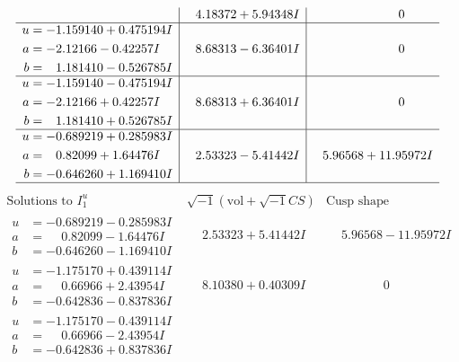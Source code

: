 \documentclass[1p]{elsarticle_modified}
\theoremstyle{definition}
\newcommand{\I}{\sqrt{-1}}
\begin{document}
$$\begin{array}{c|c|c}
 & \phantom{-}4.18372 + 5.94348 I & \phantom{-0.000000 } 0 \\ \hline\begin{aligned}
u &= -1.159140 + 0.475194 I \\
a &= -2.12166 - 0.42257 I \\
b &= \phantom{-}1.181410 - 0.526785 I\end{aligned}
 & \phantom{-}8.68313 - 6.36401 I & \phantom{-0.000000 } 0 \\ \hline\begin{aligned}
u &= -1.159140 - 0.475194 I \\
a &= -2.12166 + 0.42257 I \\
b &= \phantom{-}1.181410 + 0.526785 I\end{aligned}
 & \phantom{-}8.68313 + 6.36401 I & \phantom{-0.000000 } 0 \\ \hline\begin{aligned}
u &= -0.689219 + 0.285983 I \\
a &= \phantom{-}0.82099 + 1.64476 I \\
b &= -0.646260 + 1.169410 I\end{aligned}
 & \phantom{-}2.53323 - 5.41442 I & \phantom{-}5.96568 + 11.95972 I\\
 \hline 
 \end{array}$$\newpage$$\begin{array}{c|c|c}  
\text{Solutions to }I^u_{1}& \I (\text{vol} + \sqrt{-1}CS) & \text{Cusp shape}\\
 \hline 
\begin{aligned}
u &= -0.689219 - 0.285983 I \\
a &= \phantom{-}0.82099 - 1.64476 I \\
b &= -0.646260 - 1.169410 I\end{aligned}
 & \phantom{-}2.53323 + 5.41442 I & \phantom{-}5.96568 - 11.95972 I \\ \hline\begin{aligned}
u &= -1.175170 + 0.439114 I \\
a &= \phantom{-}0.66966 + 2.43954 I \\
b &= -0.642836 - 0.837836 I\end{aligned}
 & \phantom{-}8.10380 + 0.40309 I & \phantom{-0.000000 } 0 \\ \hline\begin{aligned}
u &= -1.175170 - 0.439114 I \\
a &= \phantom{-}0.66966 - 2.43954 I \\
b &= -0.642836 + 0.837836 I\end{aligned}

\end{array}$$
\end{document}
